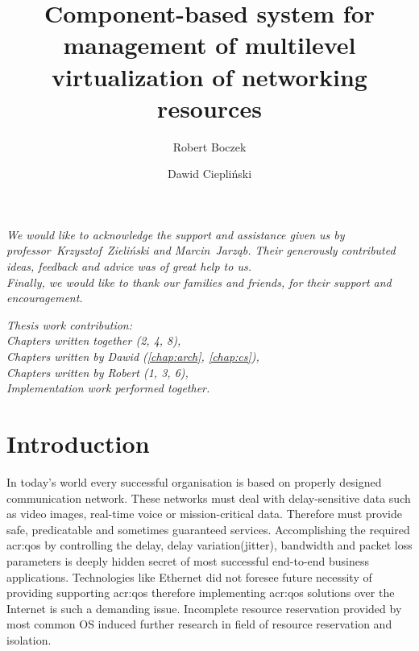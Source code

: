 \documentclass[11pt]{book}
\title{Component-based system for management of multilevel virtualization of networking resources}
\author{Robert Boczek \and Dawid Ciepliński}
\begin{document}
  \maketitle

  \tableofcontents

  \listoffigures

  \printglossaries

  \newpage
	\vspace*{2in}

	\begin{center}
    \textit{We would like to acknowledge the support and assistance given us by professor~Krzysztof~Zieliński and
            Marcin~Jarząb. Their generously contributed ideas, feedback and advice was of great help to us. \\
            Finally, we would like to thank our families and friends, for their support and encouragement.}
  \end{center}

  \newpage
	\vspace*{2in}

	\begin{center}
    \textit{Thesis work contribution: \\
            Chapters written together (2, 4, 8), \\
            Chapters written by Dawid (\ref{chap:arch}, \ref{chap:cs}), \\
            Chapters written by Robert (1, 3, 6), \\
            Implementation work performed together.}
  \end{center}

  \chapter{Introduction}

	
  In today's world every successful organisation is based on properly designed communication network. These networks
  must deal with delay-sensitive data such as video images, real-time voice or mission-critical data. Therefore must
  provide safe, predicatable and sometimes guaranteed services. Accomplishing the required \gls{acr:qos} by controlling
  the delay, delay variation(jitter), bandwidth and packet loss parameters is deeply hidden secret of most successful
  end-to-end business applications. Technologies like Ethernet did not foresee future necessity of providing supporting
  \gls{acr:qos} therefore implementing \gls{acr:qos} solutions over the Internet is such a demanding issue. Incomplete 
 resource reservation provided by most common OS induced further research in field of resource reservation and isolation. 
\end{document}
